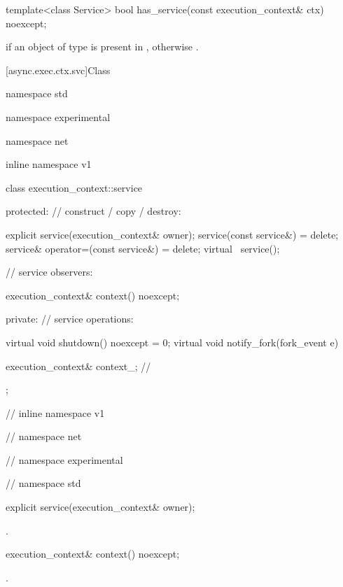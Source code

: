 \begin{itemdecl}
template<class Service> bool has_service(const execution_context& ctx) noexcept;
\end{itemdecl}

\begin{itemdescr}
\pnum
\returns {} if an object of type  is present in , otherwise .
\end{itemdescr}




[async.exec.ctx.svc]{Class }

\begin{codeblock}
namespace std {
namespace experimental {
namespace net {
inline namespace v1 {

  class execution_context::service
  {
  protected:
    // construct / copy / destroy:

    explicit service(execution_context& owner);
    service(const service&) = delete;
    service& operator=(const service&) = delete;
    virtual ~service();

    // service observers:

    execution_context& context() noexcept;

  private:
    // service operations:

    virtual void shutdown() noexcept = 0;
    virtual void notify_fork(fork_event e) {}

    execution_context& context_; // \expos
  };

} // inline namespace v1
} // namespace net
} // namespace experimental
} // namespace std
\end{codeblock}

\begin{itemdecl}
explicit service(execution_context& owner);
\end{itemdecl}

\begin{itemdescr}
\pnum
\postconditions {}.
\end{itemdescr}

\begin{itemdecl}
execution_context& context() noexcept;
\end{itemdecl}

\begin{itemdescr}
\pnum
\returns {}.
\end{itemdescr}



